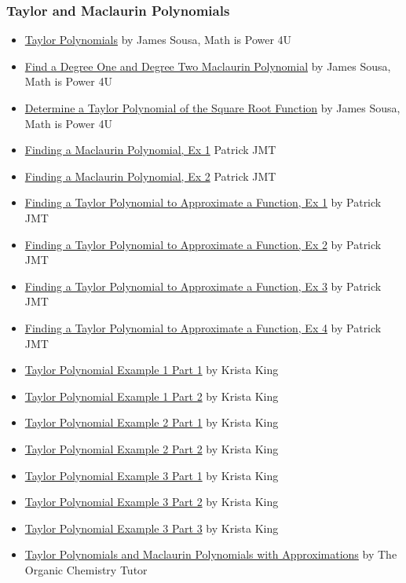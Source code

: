 \subsubsection{Taylor and Maclaurin Polynomials}
\label{sss:tayl-487b}


\begin{itemize}
    \item \href{https://www.youtube.com/watch?v=lShzrGyiueg}{Taylor Polynomials} by James Sousa, Math is Power 4U
    \item \href{https://www.youtube.com/watch?v=SC6TsVsP90U}{Find a Degree One and Degree Two Maclaurin Polynomial} by James Sousa, Math is Power 4U
    \item \href{https://www.youtube.com/watch?v=39s-mgfuuno}{Determine a Taylor Polynomial of the Square Root Function} by James Sousa, Math is Power 4U
    \item \href{https://www.youtube.com/watch?v=6eNE38s9Fv0}{Finding a Maclaurin Polynomial, Ex 1} Patrick JMT
    \item \href{https://www.youtube.com/watch?v=tYl7tXKKkSw}{Finding a Maclaurin Polynomial, Ex 2} Patrick JMT
    \item \href{https://www.youtube.com/watch?v=WKvBJdl1qrM}{Finding a Taylor Polynomial to Approximate a Function, Ex 1} by Patrick JMT
    \item \href{https://www.youtube.com/watch?v=w_oDLT5VnBI}{Finding a Taylor Polynomial to Approximate a Function, Ex 2} by Patrick JMT
    \item \href{https://www.youtube.com/watch?v=UINFWG0ErSA}{Finding a Taylor Polynomial to Approximate a Function, Ex 3} by Patrick JMT
    \item \href{https://www.youtube.com/watch?v=em4YU8rUhco}{Finding a Taylor Polynomial to Approximate a Function, Ex 4} by Patrick JMT
    \item \href{https://www.youtube.com/watch?v=C1vcVMotnkg}{Taylor Polynomial Example 1 Part 1} by Krista King
    \item \href{https://www.youtube.com/watch?v=JMU-4o-Ffus}{Taylor Polynomial Example 1 Part 2} by Krista King
    \item \href{https://www.youtube.com/watch?v=h2EGCv0PyZ8}{Taylor Polynomial Example 2 Part 1} by Krista King
    \item \href{https://www.youtube.com/watch?v=Fw9u5h4MoJo}{Taylor Polynomial Example 2 Part 2} by Krista King
    \item \href{https://www.youtube.com/watch?v=kd5nuHkKsr4}{Taylor Polynomial Example 3 Part 1} by Krista King
    \item \href{https://www.youtube.com/watch?v=l5eqQFfMp-0}{Taylor Polynomial Example 3 Part 2} by Krista King
    \item \href{https://www.youtube.com/watch?v=NWl-dwL7_Do}{Taylor Polynomial Example 3 Part 3} by Krista King
    \item \href{https://www.youtube.com/watch?v=urPIxvNBXF0}{Taylor Polynomials and Maclaurin Polynomials with Approximations} by The Organic Chemistry Tutor
\end{itemize}


